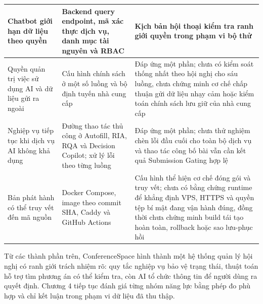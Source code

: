 \begin{longtable}{|P{0.27\textwidth}|P{0.32\textwidth}|P{0.33\textwidth}|}
  Chatbot giới hạn dữ liệu theo quyền & Backend query endpoint, mã xác thực dịch vụ, danh mục tài nguyên và RBAC & Kịch bản hội thoại kiểm tra ranh giới quyền trong phạm vi bộ thử \\ \hline
  Quyền quản trị việc sử dụng AI và dữ liệu gửi ra ngoài & Cấu hình chính sách ở một số luồng và bộ định tuyến nhà cung cấp & Đáp ứng một phần; chưa có kiểm soát thống nhất theo hội nghị cho sáu luồng, chưa chứng minh cơ chế chấp thuận gửi dữ liệu nhạy cảm hoặc kiểm toán chính sách lưu giữ của nhà cung cấp \\ \hline
  Nghiệp vụ tiếp tục khi dịch vụ AI không khả dụng & Đường thao tác thủ công ở Autofill, RIA, RQA và Decision Copilot; xử lý lỗi theo từng luồng & Đáp ứng một phần; chưa thử nghiệm chèn lỗi đầu cuối cho toàn bộ dịch vụ và thao tác công bố bài vẫn cần kết quả Submission Gating hợp lệ \\ \hline
  Bản phát hành có thể truy vết đến mã nguồn & Docker Compose, image theo commit SHA, Caddy và GitHub Actions & Cấu hình thể hiện cơ chế đóng gói và truy vết; chưa có bằng chứng runtime để khẳng định VPS, HTTPS và quyền tệp bí mật đang vận hành đúng, đồng thời chưa chứng minh build tái tạo hoàn toàn, rollback hoặc sao lưu-phục hồi \\ \hline
\end{longtable}
\endgroup

Từ các thành phần trên, ConferenceSpace hình thành một hệ thống quản lý hội nghị có ranh giới trách nhiệm rõ: quy tắc nghiệp vụ bảo vệ trạng thái, thuật toán hỗ trợ tìm phương án có thể kiểm tra, còn AI tổ chức thông tin để người dùng ra quyết định. Chương 4 tiếp tục đánh giá từng nhóm năng lực bằng phép đo phù hợp và chỉ kết luận trong phạm vi dữ liệu đã thu thập.
